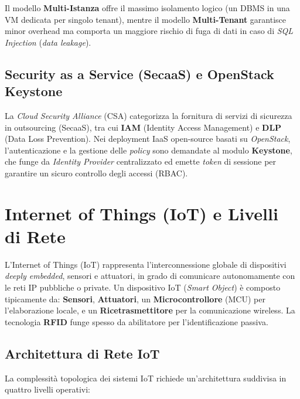 Il modello \textbf{Multi-Istanza} offre il massimo isolamento logico (un DBMS in una VM dedicata per singolo tenant), mentre il modello \textbf{Multi-Tenant} garantisce minor overhead ma comporta un maggiore rischio di fuga di dati in caso di \textit{SQL Injection} (\textit{data leakage}).

\subsection{Security as a Service (SecaaS) e OpenStack Keystone}
La \textit{Cloud Security Alliance} (CSA) categorizza la fornitura di servizi di sicurezza in outsourcing (SecaaS), tra cui \textbf{IAM} (Identity Access Management) e \textbf{DLP} (Data Loss Prevention).
Nei deployment IaaS open-source basati su \textit{OpenStack}, l'autenticazione e la gestione delle \textit{policy} sono demandate al modulo \textbf{Keystone}, che funge da \textit{Identity Provider} centralizzato ed emette \textit{token} di sessione per garantire un sicuro controllo degli accessi (RBAC).

\section{Internet of Things (IoT) e Livelli di Rete}
L'Internet of Things (IoT) rappresenta l'interconnessione globale di dispositivi \textit{deeply embedded}, sensori e attuatori, in grado di comunicare autonomamente con le reti IP pubbliche o private. Un dispositivo IoT (\textit{Smart Object}) è composto tipicamente da: \textbf{Sensori}, \textbf{Attuatori}, un \textbf{Microcontrollore} (MCU) per l'elaborazione locale, e un \textbf{Ricetrasmettitore} per la comunicazione wireless. La tecnologia \textbf{RFID} funge spesso da abilitatore per l'identificazione passiva.

\subsection{Architettura di Rete IoT}
La complessità topologica dei sistemi IoT richiede un'architettura suddivisa in quattro livelli operativi:

